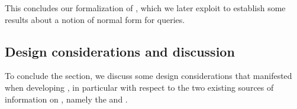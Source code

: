 

This concludes our formalization of \gql, which we later exploit to
establish some results about a notion of normal form for queries.


\subsection{Design considerations and discussion}\label{subsec:discussion}

To conclude the section, we discuss some design considerations that manifested when developing 
\gcoql, in particular with respect to the two existing sources of information on \gql, namely the \spec and \HP.

